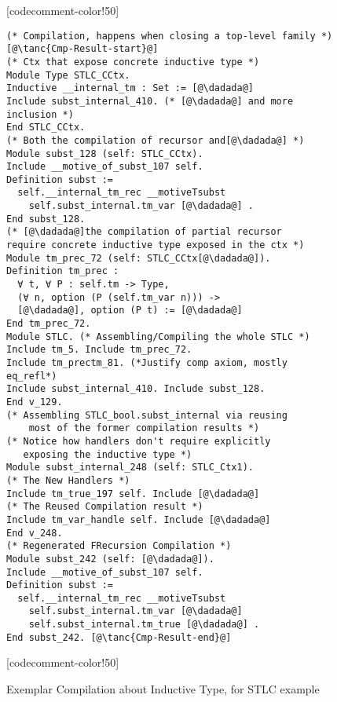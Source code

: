 \begin{figure}
\begin{minipage}{\textwidth}
\begin{multicols}{2}
[codecomment-color!50]



\begin{lstlisting}
(* Compilation, happens when closing a top-level family *) [@\tanc{Cmp-Result-start}@]
(* Ctx that expose concrete inductive type *)
Module Type STLC_CCtx.
Inductive __internal_tm : Set := [@\dadada@] 
Include subst_internal_410. (* [@\dadada@] and more inclusion *)
End STLC_CCtx.
(* Both the compilation of recursor and[@\dadada@] *)
Module subst_128 (self: STLC_CCtx).
Include __motive_of_subst_107 self.
Definition subst :=
  self.__internal_tm_rec __motiveTsubst
	self.subst_internal.tm_var [@\dadada@] .
End subst_128.
(* [@\dadada@]the compilation of partial recursor 
require concrete inductive type exposed in the ctx *)
Module tm_prec_72 (self: STLC_CCtx[@\dadada@]).
Definition tm_prec :
  ∀ t, ∀ P : self.tm -> Type,
  (∀ n, option (P (self.tm_var n))) ->
  [@\dadada@], option (P t) := [@\dadada@]
End tm_prec_72. 
Module STLC. (* Assembling/Compiling the whole STLC *)
Include tm_5. Include tm_prec_72. 
Include tm_prectm_81. (*Justify comp axiom, mostly eq_refl*)
Include subst_internal_410. Include subst_128.
End v_129.
(* Assembling STLC_bool.subst_internal via reusing 
    most of the former compilation results *)
(* Notice how handlers don't require explicitly
   exposing the inductive type *)
Module subst_internal_248 (self: STLC_Ctx1).
(* The New Handlers *)
Include tm_true_197 self. Include [@\dadada@]
(* The Reused Compilation result *)
Include tm_var_handle self. Include [@\dadada@]
End v_248. 
(* Regenerated FRecursion Compilation *)
Module subst_242 (self: [@\dadada@]).
Include __motive_of_subst_107 self.
Definition subst :=
  self.__internal_tm_rec __motiveTsubst
	self.subst_internal.tm_var [@\dadada@]
    self.subst_internal.tm_true [@\dadada@] .
End subst_242. [@\tanc{Cmp-Result-end}@]
\end{lstlisting}



[codecomment-color!50]

\end{multicols}
\end{minipage}

\caption{Exemplar Compilation about Inductive Type, for STLC example}\label{fig:plugin-example2}
\end{figure}